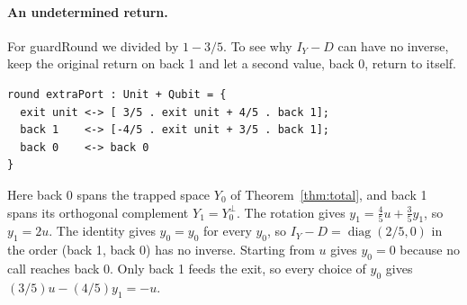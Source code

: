 \documentclass[acmsmall,screen,review,anonymous,nonacm]{acmart}
\newcommand{\storyinlineface}{\small\ttfamily}
\newcommand{\code}[1]{\textnormal{\storyinlineface #1}}
\numberwithin{equation}{section}
\begin{document}
\paragraph{An undetermined return.}
For \code{guardRound} we divided by $1-3/5$. To see why $I_Y-D$
can have no inverse, keep the original return on \code{back 1} and
let a second value, \code{back 0}, return to itself.

\par\smallskip\noindent\begin{minipage}[c]{.645\linewidth}
\begin{lstlisting}[xleftmargin=0pt]
round extraPort : Unit + Qubit = {
  exit unit <-> [ 3/5 . exit unit + 4/5 . back 1];
  back 1    <-> [-4/5 . exit unit + 3/5 . back 1];
  back 0    <-> back 0
}
\end{lstlisting}
\end{minipage}\hfill
\begin{minipage}[c]{.345\linewidth}\centering
{}
\end{minipage}\par\smallskip
Here \code{back 0} spans the trapped space $Y_0$ of
Theorem~\ref{thm:total}, and \code{back 1} spans its orthogonal
complement $Y_1=Y_0^\perp$. The rotation gives
$y_1=\tfrac45u+\tfrac35y_1$, so $y_1=2u$. The identity gives
$y_0=y_0$ for every $y_0$, so $I_Y-D=\operatorname{diag}(2/5,0)$ in the order (\code{back 1}, \code{back 0})
has no inverse. Starting from $u$ gives $y_0=0$ because no call reaches
\code{back 0}. Only \code{back 1} feeds the exit, so every choice of
$y_0$ gives $(3/5)u-(4/5)y_1=-u$.
\end{document}
